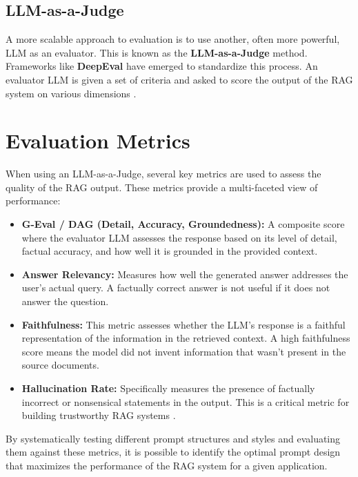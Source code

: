 \subsection{LLM-as-a-Judge}
A more scalable approach to evaluation is to use another, often more powerful, LLM as an evaluator. This is known as the \textbf{LLM-as-a-Judge} method. Frameworks like \textbf{DeepEval} have emerged to standardize this process. An evaluator LLM is given a set of criteria and asked to score the output of the RAG system on various dimensions \autocite{rag_eval_qdrant_2024}.

\section{Evaluation Metrics}
When using an LLM-as-a-Judge, several key metrics are used to assess the quality of the RAG output. These metrics provide a multi-faceted view of performance:
\begin{itemize}
    \item \textbf{G-Eval / DAG (Detail, Accuracy, Groundedness):} A composite score where the evaluator LLM assesses the response based on its level of detail, factual accuracy, and how well it is grounded in the provided context.
    \item \textbf{Answer Relevancy:} Measures how well the generated answer addresses the user's actual query. A factually correct answer is not useful if it does not answer the question.
    \item \textbf{Faithfulness:} This metric assesses whether the LLM's response is a faithful representation of the information in the retrieved context. A high faithfulness score means the model did not invent information that wasn't present in the source documents.
    \item \textbf{Hallucination Rate:} Specifically measures the presence of factually incorrect or nonsensical statements in the output. This is a critical metric for building trustworthy RAG systems \autocite{rag_eval_pinecone}.
\end{itemize}

By systematically testing different prompt structures and styles and evaluating them against these metrics, it is possible to identify the optimal prompt design that maximizes the performance of the RAG system for a given application.